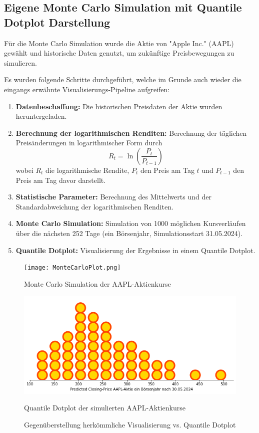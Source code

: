 \subsection{Eigene Monte Carlo Simulation mit Quantile Dotplot Darstellung}

Für die Monte Carlo Simulation wurde die Aktie von "Apple Inc." (AAPL) gewählt und historische Daten genutzt, um zukünftige Preisbewegungen zu simulieren.

Es wurden folgende Schritte durchgeführt, welche im Grunde auch wieder die eingangs erwähnte Visualisierungs-Pipeline aufgreifen:

\begin{enumerate}
\item \textbf{Datenbeschaffung:} Die historischen Preisdaten der Aktie wurden heruntergeladen.
\item \textbf{Berechnung der logarithmischen Renditen:} Berechnung der täglichen Preisänderungen in logarithmischer Form durch 
\[
R_t = \ln\left(\frac{P_t}{P_{t-1}}\right)
\]
wobei \(R_t\) die logarithmische Rendite, \(P_t\) den Preis am Tag \(t\) und \(P_{t-1}\) den Preis am Tag davor darstellt.
\item \textbf{Statistische Parameter:} Berechnung des Mittelwerts und der Standardabweichung der logarithmischen Renditen.
\item \textbf{Monte Carlo Simulation:} Simulation von 1000 möglichen Kursverläufen über die nächsten 252 Tage (ein Börsenjahr, Simulationsstart 31.05.2024).
\item \textbf{Quantile Dotplot:} Visualisierung der Ergebnisse in einem Quantile Dotplot.
\end{enumerate}

\begin{figure}[h!]
    \centering
    \begin{minipage}{0.48\textwidth}
        \centering
        \texttt{[image: MonteCarloPlot.png]}
        \caption{Monte Carlo Simulation der AAPL-Aktienkurse}
        \label{fig:montecarlo}
    \end{minipage}
    \hfill
    \begin{minipage}{0.48\textwidth}
        \centering
        \includegraphics[width=\textwidth]{../Bilder/AAPL_QDP.png}
        \caption{Quantile Dotplot der simulierten AAPL-Aktienkurse}
        \label{fig:quantiledotplot}
    \end{minipage}
    \caption{Gegenüberstellung herkömmliche Visualisierung vs. Quantile Dotplot}
    \label{fig:nebeneinander}
\end{figure}

